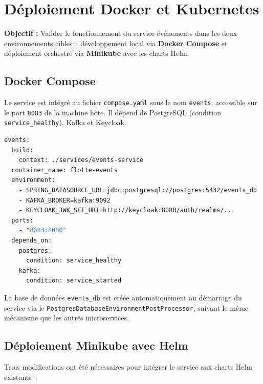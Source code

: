 \documentclass[12pt,a4paper]{article}
\begin{document}
\newpage
\section{Déploiement Docker et Kubernetes}

\begin{infobox}
\textbf{Objectif :} Valider le fonctionnement du service événements dans les deux
environnements cibles~: développement local via \textbf{Docker Compose} et
déploiement orchestré via \textbf{Minikube} avec les charts Helm.
\end{infobox}

\vspace{0.5cm}

\subsection{Docker Compose}

Le service est intégré au fichier \texttt{compose.yaml} sous le nom \texttt{events},
accessible sur le port \texttt{8083} de la machine hôte. Il dépend de PostgreSQL
(condition \texttt{service\_healthy}), Kafka et Keycloak.

\begin{lstlisting}[language=bash, caption=Extrait de la configuration Docker Compose]
events:
  build:
    context: ./services/events-service
  container_name: flotte-events
  environment:
    - SPRING_DATASOURCE_URL=jdbc:postgresql://postgres:5432/events_db
    - KAFKA_BROKER=kafka:9092
    - KEYCLOAK_JWK_SET_URI=http://keycloak:8080/auth/realms/...
  ports:
    - "8083:8080"
  depends_on:
    postgres:
      condition: service_healthy
    kafka:
      condition: service_started
\end{lstlisting}

La base de données \texttt{events\_db} est créée automatiquement au démarrage
du service via le \texttt{PostgresDatabaseEnvironmentPostProcessor}, suivant le
même mécanisme que les autres microservices.

\subsection{Déploiement Minikube avec Helm}

Trois modifications ont été nécessaires pour intégrer le service aux charts Helm
existants~:
\end{document}
